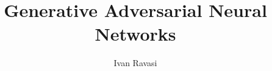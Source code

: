 \documentclass{beamer}
\title[GAN Networks]{Generative Adversarial Neural Networks}
\author[I. Ravasi]{Ivan Ravasi}
\begin{document}
    \frame{\titlepage}
    
\end{document}
